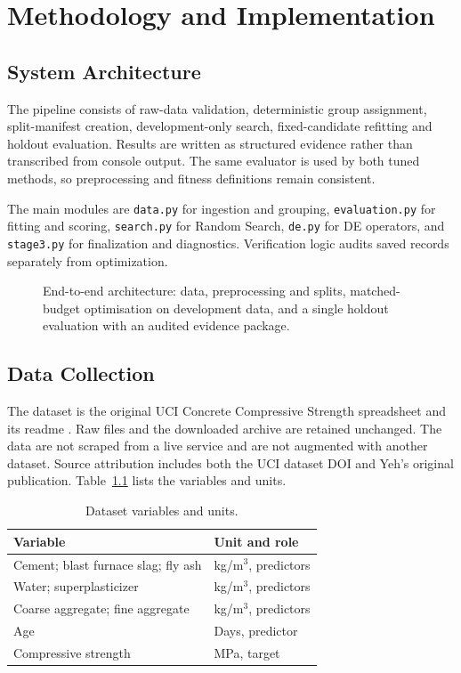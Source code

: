 \chapter{Methodology and Implementation}
\section{System Architecture}
The pipeline consists of raw-data validation, deterministic group assignment, split-manifest creation, development-only search, fixed-candidate refitting and holdout evaluation. Results are written as structured evidence rather than transcribed from console output. The same evaluator is used by both tuned methods, so preprocessing and fitness definitions remain consistent.

The main modules are \texttt{data.py} for ingestion and grouping, \texttt{evaluation.py} for fitting and scoring, \texttt{search.py} for Random Search, \texttt{de.py} for DE operators, and \texttt{stage3.py} for finalization and diagnostics. Verification logic audits saved records separately from optimization.
\begin{figure}[htbp]\centering\resizebox{\textwidth}{!}{}\caption{End-to-end architecture: data, preprocessing and splits, matched-budget optimisation on development data, and a single holdout evaluation with an audited evidence package.}\label{fig:architecture}\end{figure}
\section{Data Collection}
The dataset is the original UCI Concrete Compressive Strength spreadsheet and its readme \cite{uci}. Raw files and the downloaded archive are retained unchanged. The data are not scraped from a live service and are not augmented with another dataset. Source attribution includes both the UCI dataset DOI and Yeh's original publication. Table~\ref{tab:variables} lists the variables and units.

\begin{table}[htbp]\centering\caption{Dataset variables and units.}\label{tab:variables}\begin{tabularx}{\textwidth}{lX}\toprule Variable&Unit and role\\\midrule Cement; blast furnace slag; fly ash&kg/m$^3$, predictors\\Water; superplasticizer&kg/m$^3$, predictors\\Coarse aggregate; fine aggregate&kg/m$^3$, predictors\\Age&Days, predictor\\Compressive strength&MPa, target\\\bottomrule\end{tabularx}\end{table}
